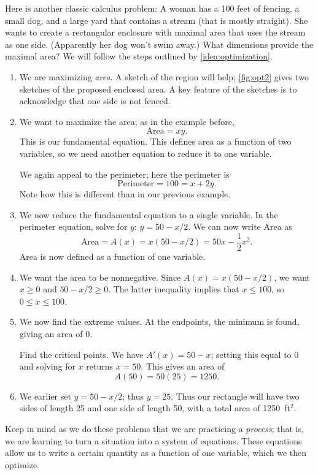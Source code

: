 \begin{example}\label{ex_opt2}%
Here is another classic calculus problem: A woman has a 100 feet of fencing, a small dog, and a large yard that contains a stream (that is mostly straight). She wants to create a rectangular enclosure with maximal area that uses the stream as one side. (Apparently her dog won't swim away.) What dimensions provide the maximal area?
\solution
We will follow the steps outlined by \autoref{idea:optimization}. 
\begin{enumerate}
	\item		We are maximizing \emph{area}. A sketch of the region will help; \autoref{fig:opt2} gives two sketches of the proposed enclosed area. A key feature of the sketches is to acknowledge that one side is not fenced. 
	
	\item		We want to maximize the area; as in the example before,
	\[\text{Area} = xy.\]
	This is our fundamental equation. This defines area as a function of two variables, so we need another equation to  reduce it to one variable.
	
	We again appeal to the perimeter; here the perimeter is
	\[\text{Perimeter} = 100 = x+2y.\]
	Note how this is different than in our previous example.
	\item		We now reduce the fundamental equation to a single variable. In the perimeter equation, solve for $y$: $y = 50 - x/2$. We can now write Area as
	\[\text{Area} = A(x) = x(50-x/2) = 50x - \frac12x^2.\]
	Area is now defined as a function of one variable.
	\item		We want the area to be nonnegative. Since $A(x) = x(50-x/2)$, we want $x\geq 0$ and $50-x/2\geq 0$. The latter inequality implies that $x\leq100$, so $0\leq x\leq 100$. 
	\item		We now find the extreme values. At the endpoints, the minimum is found, giving an area of 0. 
	
	Find the critical points. We have $A'(x) = 50-x$; setting this equal to 0 and solving for $x$ returns $x=50$. This gives an area of
	\[A(50) = 50(25) = 1250.\]
	\item		We earlier set $y = 50-x/2$; thus $y = 25$. Thus our rectangle will have two sides of length 25 and one side of length 50, with a total area of 1250~ft$^2$.
\end{enumerate}
\end{example}

Keep in mind as we do these problems that we are practicing a \emph{process}; that is, we are learning to turn a situation into a system of equations. These equations allow us to write a certain quantity as a function of one variable, which we then optimize.

